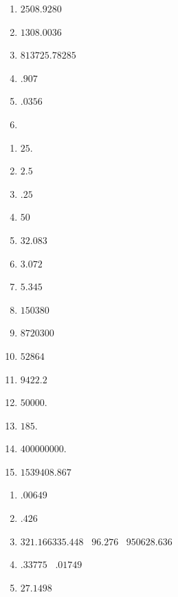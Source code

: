 
\begin{multicols}{3}
\begin{enumerate}[$(1)$]
\item $2508.9280$
\item $1308.0036$
\item $813725.78285$
\item $.907$
\item $.0356$
\item[]
\end{enumerate}
\end{multicols}


\begin{multicols}{3}
\begin{enumerate}[$(1)$]
\item $25.$
\item $2.5$
\item $.25$
\item $50$
\item $32.083$
\item $3.072$
\item $5.345$
\item $150380$
\item $8720300$
\item $52864$
\item $9422.2$
\item $50000.$
\item $185.$
\item $400000000.$
\item $1539408.867$
\end{enumerate}
\end{multicols}


\begin{multicols}{3}
\begin{enumerate}[$(1)$]
\item $.00649$
\item $.426$
\item $321.166335.448$ ~$96.276$~ $950628.636$
\item $.33775$~ $.01749$
\item $27.1498$
\end{enumerate}
\end{multicols}

\newpage
{}

